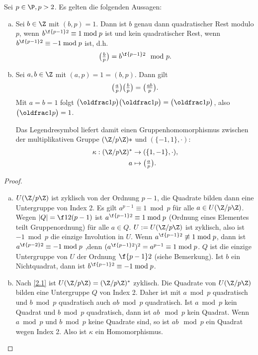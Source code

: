 \begin{lem} \label{2.14}
	Sei $p \in \P, p > 2$.
	Es gelten die folgenden Aussagen:
	\begin{enumerate}[a)]
		\item
			Sei $b \in \Z$ mit $(b, p) = 1$.
			Dann ist $b$ genau dann quadratischer Rest modulo $p$, wenn $b^{\f {p-1}2} \equiv 1 \bmod p$
			ist und kein quadratischer Rest, wenn $b^{\f {p-1}2} \equiv -1 \bmod p$	ist, d.h.
			\[
				\legsym bp = b^{\f {p-1}2} \mod p.
			\]
		\item
			Sei $a, b \in \Z$ mit $(a,p) = 1 = (b, p)$.
			Dann gilt
			\[
				\legsym ap \legsym bp = \legsym {ab}p.
			\]
			Mit $a = b = 1$ folgt $\legsym 1p \legsym 1p = \legsym 1p$, also $\legsym 1p = 1$.

			Das Legendresymbol liefert damit einen Gruppenhomomorphismus zwischen der multiplikativen Gruppe $(\Z / p\Z)*$ und $(\{-1,1\}, \cdot)$:
			\begin{align*}
				\kappa: (\Z / p\Z)^* &\to (\{1,-1\}, \cdot), \\
				a &\mapsto \legsym ap.
			\end{align*}
	\end{enumerate}
	\begin{proof}
		\begin{enumerate}[a)]
			\item
				$U(\Z / p\Z)$ ist zyklisch von der Ordnung $p - 1$, die Quadrate bilden dann eine Untergruppe von Index 2.
				Es gilt $a^{p-1} \equiv 1 \bmod p$ für alle $a \in U(\Z / p\Z)$.
				Wegen $|Q| = \f 12 (p-1)$ ist $a^{\f {p-1}2} \equiv 1 \bmod p$ (Ordnung eines Elementes teilt Gruppenordnung) für alle $a \in Q$.
				$U := U(\Z / p \Z)$ ist zyklisch, also ist $-1 \bmod p$ die einzige Involution in $U$.
				Wenn $a^{\f{p-1}2} \not\equiv 1 \bmod p$, dann ist $a^{\f{p-2}2} \equiv -1 \bmod p$ ,denn $(a^{\f{p-1}2})^2 = a^{p-1} \equiv 1 \bmod p$.
				$Q$ ist die einzige Untergruppe von $U$ der Ordnung $\f{p-1}2$ (siehe Bemerkung).
				Ist $b$ ein Nichtquadrat, dann ist $b^{\f{p-1}2} \equiv -1 \bmod p$.
			\item
				Nach \ref{2.1} ist $U(\Z / p\Z) = (\Z / p\Z)^*$ zyklisch.
				Die Quadrate von $U(\Z / p \Z)$ bilden eine Untergruppe $Q$ von Index 2. \Exercise
				Daher ist mit $a \bmod p$ quadratisch und $b \bmod p$ quadratisch auch $ab \bmod p$ quadratisch.
				Ist $a \bmod p$ kein Quadrat und $b \bmod p$ quadratisch, dann ist $ab \mod p$ kein Quadrat.
				Wenn $a \bmod p$ und $b \bmod p$ keine Quadrate sind, so ist $ab \mod p$ ein Quadrat wegen Index 2.
				Also ist $\kappa$ ein Homomorphismus.
		\end{enumerate}
	\end{proof}
\end{lem}

